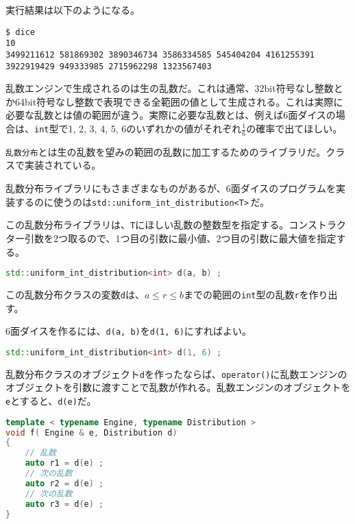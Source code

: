 実行結果は以下のようになる。

\ifTombow\pagebreak\fi
\begin{lstlisting}[style=terminal]
$ dice
10
3499211612 581869302 3890346734 3586334585 545404204 4161255391 3922919429 949333985 2715962298 1323567403 
\end{lstlisting}

乱数エンジンで生成されるのは生の乱数だ。これは通常、32bit符号なし整数とか64bit符号なし整数で表現できる全範囲の値として生成される。これは実際に必要な乱数とは値の範囲が違う。実際に必要な乱数とは、例えば6面ダイスの場合は、\texttt{int}型で1, 2, 3, 4, 5, 6のいずれかの値がそれぞれ\(\frac{1}{6}\)の確率で出てほしい。


\texttt{乱数分布}とは生の乱数を望みの範囲の乱数に加工するためのライブラリだ。クラスで実装されている。

乱数分布ライブラリにもさまざまなものがあるが、6面ダイスのプログラムを実装するのに使うのは\texttt{std::uniform\_int\_distribution<T>}\,だ。

この乱数分布ライブラリは、\texttt{T}にほしい乱数の整数型を指定する。コンストラクター引数を2つ取るので、1つ目の引数に最小値、2つ目の引数に最大値を指定する。

\begin{lstlisting}[language={C++}]
std::uniform_int_distribution<int> d(a, b) ;
\end{lstlisting}

この乱数分布クラスの変数\texttt{d}は、\(a \leq r \leq b\)までの範囲の\texttt{int}型の乱数\texttt{r}を作り出す。

6面ダイスを作るには、\texttt{d(a, b)}を\texttt{d(1, 6)}にすればよい。

\begin{lstlisting}[language={C++}]
std::uniform_int_distribution<int> d(1, 6) ;
\end{lstlisting}

乱数分布クラスのオブジェクト\texttt{d}を作ったならば、\texttt{operator()}に乱数エンジンのオブジェクトを引数に渡すことで乱数が作れる。乱数エンジンのオブジェクトを\texttt{e}とすると、\texttt{d(e)}だ。

\begin{lstlisting}[language={C++}]
template < typename Engine, typename Distribution >
void f( Engine & e, Distribution d)
{
    // 乱数
    auto r1 = d(e) ;
    // 次の乱数   
    auto r2 = d(e) ;
    // 次の乱数
    auto r3 = d(e) ; 
}
\end{lstlisting}

